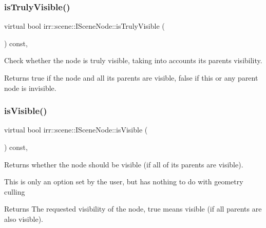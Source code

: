 \subsubsection{\texorpdfstring{is\+Truly\+Visible()}{isTrulyVisible()}}
{\footnotesize\ttfamily virtual bool irr\+::scene\+::\+I\+Scene\+Node\+::is\+Truly\+Visible (\begin{DoxyParamCaption}{ }\end{DoxyParamCaption}) const\hspace{0.3cm}{\ttfamily [inline]}, {\ttfamily [virtual]}}



Check whether the node is truly visible, taking into accounts its parents\textquotesingle{} visibility. 

\begin{DoxyReturn}{Returns}
true if the node and all its parents are visible, false if this or any parent node is invisible. 
\end{DoxyReturn}
\mbox{\label{classirr_1_1scene_1_1ISceneNode_a9e8e4e8be0055e8182eb26b055abf339}} 
\subsubsection{\texorpdfstring{is\+Visible()}{isVisible()}}
{\footnotesize\ttfamily virtual bool irr\+::scene\+::\+I\+Scene\+Node\+::is\+Visible (\begin{DoxyParamCaption}{ }\end{DoxyParamCaption}) const\hspace{0.3cm}{\ttfamily [inline]}, {\ttfamily [virtual]}}



Returns whether the node should be visible (if all of its parents are visible). 

This is only an option set by the user, but has nothing to do with geometry culling \begin{DoxyReturn}{Returns}
The requested visibility of the node, true means visible (if all parents are also visible). 
\end{DoxyReturn}
\mbox{\label{classirr_1_1scene_1_1ISceneNode_afc1dcb5cb19116d0c7aa3d4ebdf04cc5}} 
